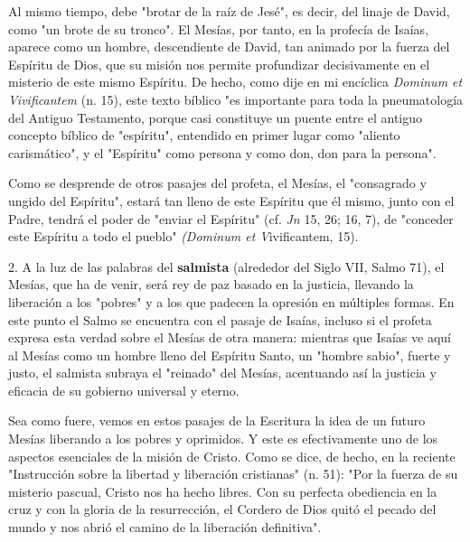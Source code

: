 Al mismo tiempo, debe "brotar de la raíz de Jesé", es decir, del linaje
de David, como "un brote de su tronco". El Mesías, por tanto, en la
profecía de Isaías, aparece como un hombre, descendiente de David, tan
animado por la fuerza del Espíritu de Dios, que su misión nos permite
profundizar decisivamente en el misterio de este mismo Espíritu. De
hecho, como dije en mi encíclica \emph{Dominum et Vivificantem} (n. 15),
este texto bíblico "es importante para toda la pneumatología del Antiguo
Testamento, porque casi constituye un puente entre el antiguo concepto
bíblico de "espíritu", entendido en primer lugar como "aliento
carismático", y el "Espíritu" como persona y como don, don para la
persona".

Como se desprende de otros pasajes del profeta, el Mesías, el
"consagrado y ungido del Espíritu", estará tan lleno de este Espíritu
que él mismo, junto con el Padre, tendrá el poder de "enviar el
Espíritu" (cf. \emph{Jn} 15, 26; 16, 7), de "conceder este Espíritu a
todo el pueblo" \emph{(Dominum et V}ivificantem, 15).

2. A la luz de las palabras del \textbf{salmista} (alrededor del Siglo
VII, Salmo 71), el Mesías, que ha de venir, será rey de paz basado en la
justicia, llevando la liberación a los "pobres" y a los que padecen la
opresión en múltiples formas. En este punto el Salmo se encuentra con el
pasaje de Isaías, incluso si el profeta expresa esta verdad sobre el
Mesías de otra manera: mientras que Isaías ve aquí al Mesías como un
hombre lleno del Espíritu Santo, un "hombre sabio", fuerte y justo, el
salmista subraya el "reinado" del Mesías, acentuando así la justicia y
eficacia de su gobierno universal y eterno.

Sea como fuere, vemos en estos pasajes de la Escritura la idea de un
futuro Mesías liberando a los pobres y oprimidos. Y este es
efectivamente uno de los aspectos esenciales de la misión de Cristo.
Como se dice, de hecho, en la reciente "Instrucción sobre la libertad y
liberación cristianas" (n. 51): "Por la fuerza de su misterio pascual,
Cristo nos ha hecho libres. Con su perfecta obediencia en la cruz y con
la gloria de la resurrección, el Cordero de Dios quitó el pecado del
mundo y nos abrió el camino de la liberación definitiva".

